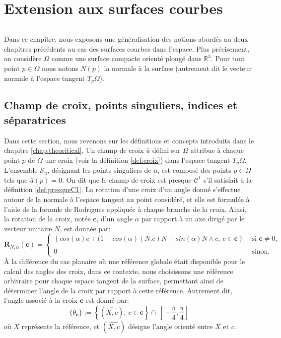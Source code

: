 \chapter{Extension aux surfaces courbes}
\label{chap:surface_courbe}
\minitoc

\[\]

Dans ce chapitre, nous exposons une généralisation des notions abordés au deux chapitres précédents au cas des surfaces courbes dans l'espace. Plus précisement, on considère $\Omega$ comme une surface compacte orienté plongé dans $\mathbb{R}^3$. Pour tout point $p\in\Omega$ nous notons $N(p)$ la normale à la surface (autrement dit le vecteur normale à l'espace tangent $T_p\Omega$).

\section{Champ de croix, points singuliers, indices et séparatrices}

Dans cette section, nous revenons sur les définitions et concepts introduits dans le chapitre \ref{chap:theoritical}. Un champ de croix $\bar{u}$ défini sur $\Omega$ attribue à chaque point $p$ de $\Omega$ une croix (voir la définition \ref{def:croix}) dans l'espace tangent $T_p\Omega$. L'ensemble $\mathcal{S}_{\bar{u}}$, désignant les points singuliers de $\bar{u}$, est composé des points $p \in \Omega$ tels que $\bar{u}(p) = 0$. On dit que le champ de croix est presque-$\mathcal{C}^1$ s'il satisfait à la définition \ref{def:presqueC1}. La rotation d'une croix d'un angle donné s'effectue autour de la normale à l'espace tangent au point considéré, et elle est formulée à l'aide de la formule de Rodrigues \cite{trucco1998introductory} appliquée à chaque branche de la croix. Ainsi, la rotation de la croix, notée $\mathbf{c}$, d'un angle $\alpha$ par rapport à un axe dirigé par le vecteur unitaire $N$, est donnée par:
\begin{equation}
\mathbf{R}_{N,\alpha}(\mathbf{c})=
\left\{
\begin{array}{ll}
\displaystyle\left\{cos(\alpha)c+(1-cos(\alpha)(N.c)N+sin(\alpha)N\wedge c,~ c\in\mathbf{c}\right\} &\mbox{ si }\mathbf{c}\neq 0,\\\\
0& \text{ sinon},
\end{array}
\right.
\end{equation}
À la différence du cas planaire où une référence globale était disponible pour le calcul des angles des croix, dans ce contexte, nous choisissons une référence arbitraire pour chaque espace tangent de la surface, permettant ainsi de déterminer l'angle de la croix par rapport à cette référence. Autrement dit, l'angle associé à la croix $\mathbf{c}$ est donné par:
$$
\{\theta_{\mathbf{c}}\} := \left\{(\widehat{X,c}),~c\in \mathbf{c}\right\} \cap \left]-\frac{\pi}{4},\frac{\pi}{4}\right]
$$
où $X$ représente la référence, et $(\widehat{X,c})$ désigne l'angle orienté entre $X$ et $c$.

